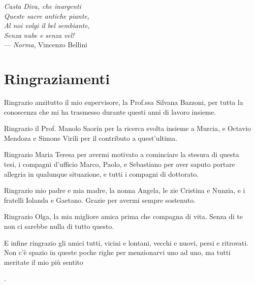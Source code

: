 
\begin{flushright}{\slshape
Casta Diva, che inargenti\\
Queste sacre antiche piante,\\
Al noi volgi il bel sembiante,\\
Senza nube e senza vel!} \\ \medskip
    --- \textit{Norma}, Vincenzo Bellini
\end{flushright}



\bigskip

\begingroup
\let\clearpage\relax
\let\cleardoublepage\relax
\let\cleardoublepage\relax
\chapter*{Ringraziamenti}
Ringrazio anzitutto il mio supervisore, la Prof.ssa Silvana Bazzoni, per tutta la conoscenza che mi ha trasmesso durante questi anni di lavoro insieme.

Ringrazio il Prof. Manolo Saor\'in per la ricerca svolta insieme a Murcia, e Octavio Mendoza e Simone Virili per il contributo a quest'ultima.

Ringrazio Maria Teresa per avermi motivato a cominciare la stesura di questa tesi, i compagni d'ufficio Marco, Paolo, e Sebastiano per aver saputo portare allegria in qualunque situazione, e tutti i compagni di dottorato.

Ringrazio mio padre e mia madre, la nonna Angela, le zie Cristina e Nunzia, e i fratelli Iolanda e Gaetano. Grazie per avermi sempre sostenuto.

Ringrazio Olga, la mia migliore amica prima che compagna di vita. Senza di te non ci sarebbe nulla di tutto questo.

E infine ringrazio gli amici tutti, vicini e lontani, vecchi e nuovi, persi e ritrovati. Non c'\`e spazio in queste poche righe per menzionarvi uno ad uno, ma tutti meritate il mio pi\`u sentito

\begin{flushright}
  . \hphantom{grazie}
\end{flushright}

\endgroup



